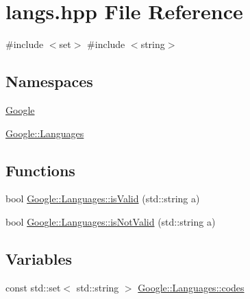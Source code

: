 \hypertarget{a00020}{}\section{langs.\+hpp File Reference}
\label{a00020}
{\ttfamily \#include $<$set$>$}\newline
{\ttfamily \#include $<$string$>$}\newline
\subsection*{Namespaces}
\begin{DoxyCompactItemize}
\item 
 \hyperlink{a00038}{Google}
\item 
 \hyperlink{a00042}{Google\+::\+Languages}
\end{DoxyCompactItemize}
\subsection*{Functions}
\begin{DoxyCompactItemize}
\item 
bool \hyperlink{a00042_a865e8f79f8de870b2e6eb5cf40b0fac9}{Google\+::\+Languages\+::is\+Valid} (std\+::string a)
\item 
bool \hyperlink{a00042_a0ed7c663d00601bb86dd56e55a5304a8}{Google\+::\+Languages\+::is\+Not\+Valid} (std\+::string a)
\end{DoxyCompactItemize}
\subsection*{Variables}
\begin{DoxyCompactItemize}
\item 
const std\+::set$<$ std\+::string $>$ \hyperlink{a00042_a7323c7ef1fa5d84f505aa504095b788a}{Google\+::\+Languages\+::codes}
\end{DoxyCompactItemize}
